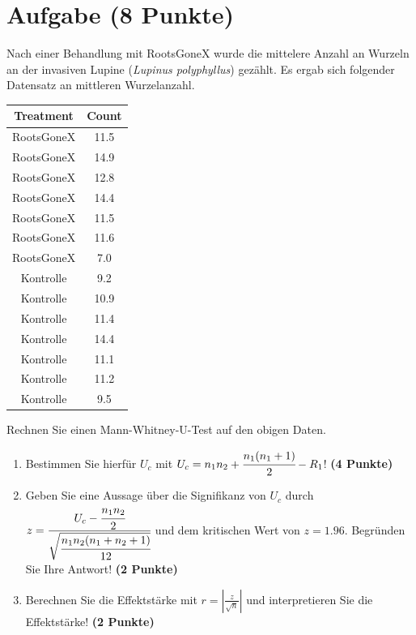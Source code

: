 \documentclass[a4paper, 10pt]{scrartcl}\usepackage[]{graphicx}\usepackage[]{xcolor}
\newenvironment{knitrout}{}{} %
\begin{document}
\section{Aufgabe \hfill (8 Punkte)}



Nach einer Behandlung mit RootsGoneX wurde die mittelere Anzahl an Wurzeln
an der invasiven Lupine (\textit{Lupinus polyphyllus}) gez{\"a}hlt. Es ergab sich
folgender Datensatz an mittleren Wurzelanzahl.

\begin{knitrout}
\color{fgcolor}\begin{table}[!h]
\centering
\begin{tabular}{cc}
\toprule
Treatment & Count\\
\midrule
RootsGoneX & 11.5\\
RootsGoneX & 14.9\\
RootsGoneX & 12.8\\
RootsGoneX & 14.4\\
RootsGoneX & 11.5\\
\addlinespace
RootsGoneX & 11.6\\
RootsGoneX & 7.0\\
Kontrolle & 9.2\\
Kontrolle & 10.9\\
Kontrolle & 11.4\\
\addlinespace
Kontrolle & 14.4\\
Kontrolle & 11.1\\
Kontrolle & 11.2\\
Kontrolle & 9.5\\
\bottomrule
\end{tabular}
\end{table}

\end{knitrout}

Rechnen Sie einen Mann-Whitney-U-Test auf den obigen Daten.

\begin{enumerate}
\item Bestimmen Sie hierf{\"u}r $U_c$ mit $U_c = n_1n_2 +
  \cfrac{n_1(n_1+1)}{2}-R_1$! \textbf{(4 Punkte)} 
\item Geben Sie eine Aussage {\"u}ber die Signifikanz von $U_c$ durch $z =
  \cfrac{U_c - \cfrac{n_1n_2}{2}}{\sqrt{\cfrac{n_1n_2(n_1+n_2+1)}{12}}}$ und
  dem kritischen Wert von $z = 1.96$. Begr{\"u}nden Sie Ihre Antwort! \textbf{(2 Punkte)} 
\item Berechnen Sie die Effektst{\"a}rke mit $r = |\frac{z}{\sqrt{n}}| $ und
  interpretieren Sie die Effektst{\"a}rke! \textbf{(2 Punkte)} 
\end{enumerate} 
\clearpage
\end{document}
